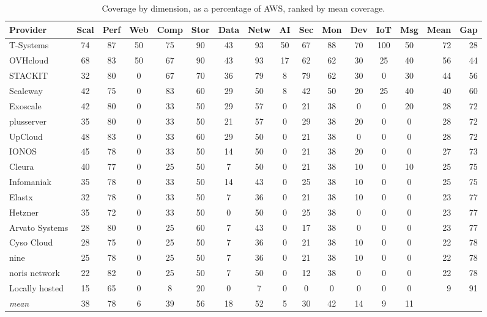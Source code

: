 \begin{table}[htbp]
  \centering
  \caption{Coverage by dimension, as a percentage of \acs{AWS},
           ranked by mean coverage.}
  \label{tab:readiness-matrix}
  \scriptsize
  \renewcommand{\arraystretch}{1.25}
  \setlength{\tabcolsep}{3.2pt}
  \begin{tabular*}{\textwidth}{@{\extracolsep{\fill}}l *{13}{c} r r@{}}
    \toprule
    \textbf{Provider}
    & \textbf{Scal} & \textbf{Perf} & \textbf{Web} & \textbf{Comp}
    & \textbf{Stor} & \textbf{Data} & \textbf{Netw} & \textbf{AI}
    & \textbf{Sec} & \textbf{Mon} & \textbf{Dev} & \textbf{IoT}
    & \textbf{Msg} & \textbf{Mean} & \textbf{Gap} \\
    \midrule
    T-Systems      & 74 & 87 & 50 & 75 & 90 & 43 & 93 & 50 & 67 & 88 & 70 & 100 & 50 & 72 & 28 \\
    OVHcloud       & 68 & 83 & 50 & 67 & 90 & 43 & 93 & 17 & 62 & 62 & 30 & 25 & 40 & 56 & 44 \\
    STACKIT        & 32 & 80 &  0 & 67 & 70 & 36 & 79 &  8 & 79 & 62 & 30 &  0 & 30 & 44 & 56 \\
    Scaleway       & 42 & 75 &  0 & 83 & 60 & 29 & 50 &  8 & 42 & 50 & 20 & 25 & 40 & 40 & 60 \\
    Exoscale       & 42 & 80 &  0 & 33 & 50 & 29 & 57 &  0 & 21 & 38 &  0 &  0 & 20 & 28 & 72 \\
    plusserver     & 35 & 80 &  0 & 33 & 50 & 21 & 57 &  0 & 29 & 38 & 20 &  0 &  0 & 28 & 72 \\
    UpCloud        & 48 & 83 &  0 & 33 & 60 & 29 & 50 &  0 & 21 & 38 &  0 &  0 &  0 & 28 & 72 \\
    IONOS          & 45 & 78 &  0 & 33 & 50 & 14 & 50 &  0 & 21 & 38 & 20 &  0 &  0 & 27 & 73 \\
    Cleura         & 40 & 77 &  0 & 25 & 50 &  7 & 50 &  0 & 21 & 38 & 10 &  0 & 10 & 25 & 75 \\
    Infomaniak     & 35 & 78 &  0 & 33 & 50 & 14 & 43 &  0 & 25 & 38 & 10 &  0 &  0 & 25 & 75 \\
    Elastx         & 32 & 78 &  0 & 33 & 50 &  7 & 36 &  0 & 21 & 38 & 10 &  0 &  0 & 23 & 77 \\
    Hetzner        & 35 & 72 &  0 & 33 & 50 &  0 & 50 &  0 & 25 & 38 &  0 &  0 &  0 & 23 & 77 \\
    Arvato Systems & 28 & 80 &  0 & 25 & 60 &  7 & 43 &  0 & 17 & 38 &  0 &  0 &  0 & 23 & 77 \\
    Cyso Cloud     & 28 & 75 &  0 & 25 & 50 &  7 & 36 &  0 & 21 & 38 & 10 &  0 &  0 & 22 & 78 \\
    nine           & 25 & 78 &  0 & 25 & 50 &  7 & 36 &  0 & 21 & 38 & 10 &  0 &  0 & 22 & 78 \\
    noris network  & 22 & 82 &  0 & 25 & 50 &  7 & 50 &  0 & 12 & 38 &  0 &  0 &  0 & 22 & 78 \\
    Locally hosted & 15 & 65 &  0 &  8 & 20 &  0 &  7 &  0 &  0 &  0 &  0 &  0 &  0 &  9 & 91 \\
    \midrule
    \textit{mean}  & 38 & 78 &  6 & 39 & 56 & 18 & 52 &  5 & 30 & 42 & 14 &  9 & 11 & & \\
    \bottomrule
  \end{tabular*}
\end{table}

